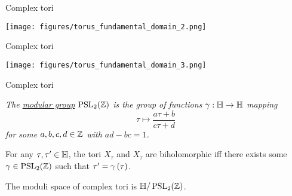 \documentclass{beamer}
\begin{document}
    \begin{frame}{Complex tori}
        \begin{center}
            \texttt{[image: figures/torus\_fundamental\_domain\_2.png]}
        \end{center}
    \end{frame}
    \begin{frame}{Complex tori}
        \begin{center}
            \texttt{[image: figures/torus\_fundamental\_domain\_3.png]}
        \end{center}
    \end{frame}
    \begin{frame}{Complex tori}
        \begin{definition}
            \textit{The \ul{modular group} $\operatorname{PSL}_{2}\!\left(\mathbb{Z}\right)$ is the group of functions $\gamma:\mathbb{H}\to\mathbb{H}$ mapping}
            \begin{equation*}
                \tau\mapsto\frac{a\tau+b}{c\tau+d}
            \end{equation*}
            \textit{for some $a,b,c,d\in\mathbb{Z}$ with $ad-bc=1$.}
        \end{definition}

        \pause

        \begin{theorem}
            For any $\tau,\tau'\in\mathbb{H}$, the tori $X_\tau$ and $X_{\tau}$ are biholomorphic iff there exists some $\gamma\in\operatorname{PSL}_{2}\!\left(\mathbb{Z}\right)$ such that $\tau'=\gamma\left(\tau\right)$.
        \end{theorem}

        \pause

        \begin{corollary}
            The moduli space of complex tori is $\mathbb{H}/\operatorname{PSL}_{2}\!\left(\mathbb{Z}\right)$.
        \end{corollary}
    \end{frame}
\end{document}
